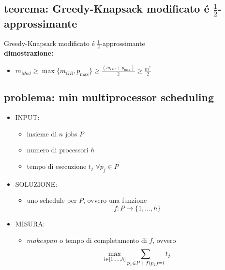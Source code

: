 
\subsection*{teorema: Greedy-Knapsack modificato \'e $\frac{1}{2}$-approssimante}
\begin{flushleft}
	Greedy-Knapsack modificato \'e $\frac{1}{2}$-approssimante \newline \\
	\vspace{0.5cm}
	\textbf{dimostrazione:}
	\begin{itemize}
		\item $m_{Mod}\geq\max\{m_{GR},p_{\max}\}\geq\frac{(m_{GR}+p_{\max})}{2}\geq\frac{m^*}{2}$
	\end{itemize}
\end{flushleft}


\subsection*{problema: min multiprocessor scheduling}
\begin{flushleft}
	\begin{itemize}
		\item INPUT:
		\begin{itemize}
			\item insieme di $n$ jobs $P$
			\item numero di processori $h$
			\item tempo di esecuzione $t_j$ $\forall p_j\in P$
		\end{itemize}
		\item SOLUZIONE:
		\begin{itemize}
			\item uno schedule per $P$, ovvero una funzione
				$$f:P\rightarrow\{1,\ldots,h\}$$
		\end{itemize}
		\item MISURA:
		\begin{itemize}
			\item $makespan$ o tempo di completamento di $f$, ovvero
				$$\max_{i\in[1,\ldots,h]}\sum_{p_j\in P\hspace{0.1cm}\vert\hspace{0.1cm}f(p_j)=i}t_j$$
		\end{itemize}
	\end{itemize}
\end{flushleft}

